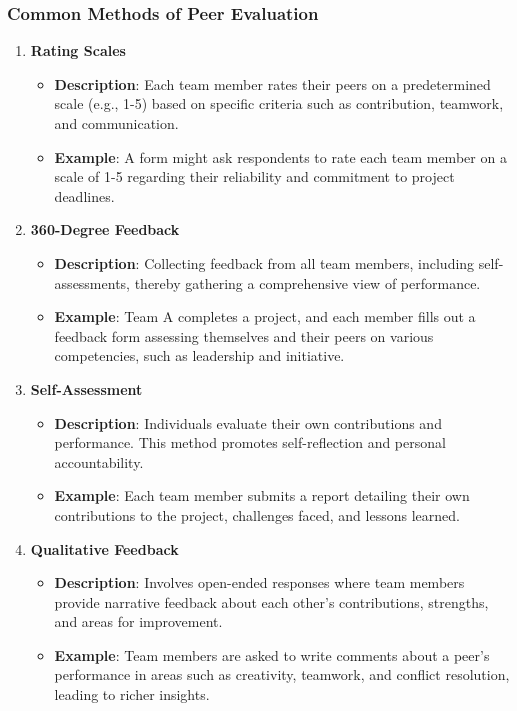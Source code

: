 \documentclass[aspectratio=169]{beamer}
\begin{document}
\begin{frame}[fragile]
    \frametitle{Common Methods of Peer Evaluation}
    \begin{enumerate}
        \item \textbf{Rating Scales}
            \begin{itemize}
                \item \textbf{Description}: Each team member rates their peers on a predetermined scale (e.g., 1-5) based on specific criteria such as contribution, teamwork, and communication.
                \item \textbf{Example}: A form might ask respondents to rate each team member on a scale of 1-5 regarding their reliability and commitment to project deadlines.
            \end{itemize}
        \item \textbf{360-Degree Feedback}
            \begin{itemize}
                \item \textbf{Description}: Collecting feedback from all team members, including self-assessments, thereby gathering a comprehensive view of performance.
                \item \textbf{Example}: Team A completes a project, and each member fills out a feedback form assessing themselves and their peers on various competencies, such as leadership and initiative.
            \end{itemize}
        \item \textbf{Self-Assessment}
            \begin{itemize}
                \item \textbf{Description}: Individuals evaluate their own contributions and performance. This method promotes self-reflection and personal accountability.
                \item \textbf{Example}: Each team member submits a report detailing their own contributions to the project, challenges faced, and lessons learned.
            \end{itemize}
        \item \textbf{Qualitative Feedback}
            \begin{itemize}
                \item \textbf{Description}: Involves open-ended responses where team members provide narrative feedback about each other's contributions, strengths, and areas for improvement.
                \item \textbf{Example}: Team members are asked to write comments about a peer’s performance in areas such as creativity, teamwork, and conflict resolution, leading to richer insights.
            \end{itemize}
    \end{enumerate}
\end{frame}
\end{document}

